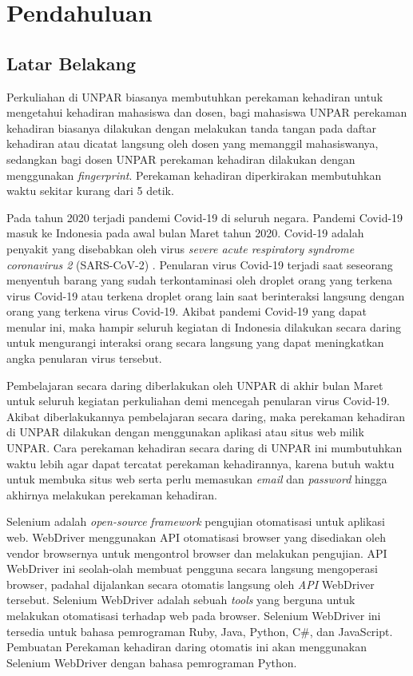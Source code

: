 \chapter{Pendahuluan}
\label{chap:intro}
   
\section{Latar Belakang}
\label{sec:label}
Perkuliahan di UNPAR biasanya membutuhkan perekaman kehadiran untuk mengetahui kehadiran mahasiswa dan dosen, bagi mahasiswa UNPAR perekaman kehadiran biasanya dilakukan dengan melakukan tanda tangan pada daftar kehadiran atau dicatat langsung oleh dosen yang memanggil mahasiswanya, sedangkan bagi dosen UNPAR perekaman kehadiran dilakukan dengan menggunakan  \textit{fingerprint}. Perekaman kehadiran diperkirakan membutuhkan waktu sekitar kurang dari 5 detik.

Pada tahun 2020 terjadi pandemi Covid-19 di seluruh negara. Pandemi Covid-19 masuk ke Indonesia pada awal bulan Maret tahun 2020. Covid-19 adalah penyakit yang disebabkan oleh virus \textit{severe acute respiratory syndrome coronavirus 2} (SARS-CoV-2) \cite{covid:12:tango}. Penularan virus Covid-19 terjadi saat seseorang menyentuh barang yang sudah terkontaminasi oleh droplet orang yang terkena virus Covid-19 atau terkena droplet orang lain saat berinteraksi langsung dengan orang yang terkena virus Covid-19.  Akibat pandemi Covid-19 yang dapat menular ini, maka hampir seluruh kegiatan di Indonesia dilakukan secara daring untuk mengurangi interaksi orang secara langsung yang dapat meningkatkan angka penularan virus tersebut. 

Pembelajaran secara daring diberlakukan oleh UNPAR di akhir bulan Maret untuk seluruh kegiatan perkuliahan demi mencegah penularan virus Covid-19. Akibat diberlakukannya pembelajaran secara daring, maka perekaman kehadiran di UNPAR dilakukan dengan menggunakan aplikasi atau situs web milik UNPAR. Cara perekaman kehadiran secara daring di UNPAR ini mumbutuhkan waktu lebih agar dapat tercatat perekaman kehadirannya, karena butuh waktu untuk membuka situs web serta perlu memasukan \textit{email} dan \textit{password} hingga akhirnya melakukan perekaman kehadiran. 

Selenium adalah \textit{open-source} \textit{framework} pengujian otomatisasi untuk aplikasi web. WebDriver menggunakan API otomatisasi browser yang disediakan oleh vendor browsernya untuk mengontrol browser dan melakukan pengujian. API WebDriver ini seolah-olah membuat pengguna secara langsung mengoperasi browser, padahal dijalankan secara otomatis langsung oleh \textit{API} WebDriver tersebut. Selenium WebDriver adalah sebuah \textit{tools} yang berguna untuk melakukan otomatisasi terhadap web pada browser. Selenium WebDriver ini tersedia untuk bahasa pemrograman Ruby, Java, Python, C\#, dan JavaScript. Pembuatan Perekaman kehadiran daring otomatis ini akan menggunakan Selenium WebDriver dengan bahasa pemrograman Python.  

